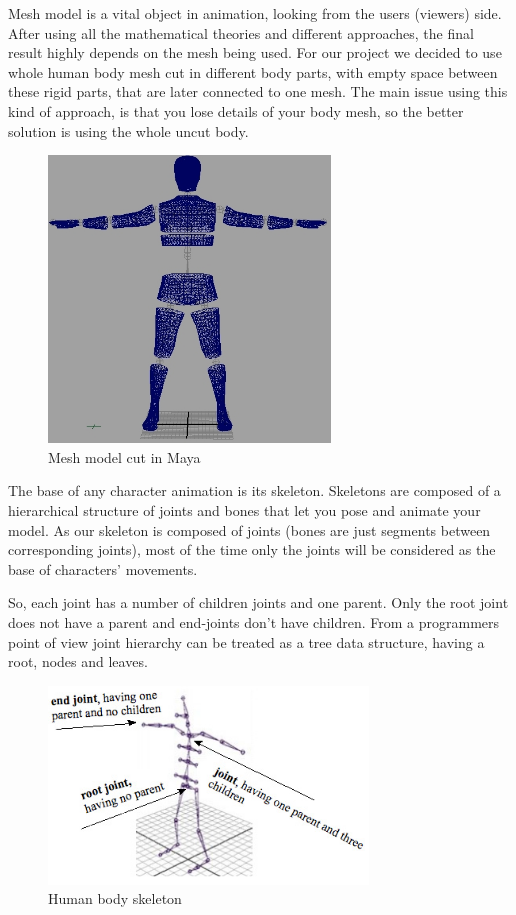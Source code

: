 \documentclass[times, 10pt,twocolumn]{article}
\begin{document}

Mesh model is a vital object in animation, looking from the users (viewers) side.
After using all the mathematical theories and different approaches, the final result
highly depends on the mesh being used.
For our project we decided to use whole human body mesh cut in different body parts,
with empty space between these rigid parts, that are later connected to one mesh.
The main issue using this kind of approach, is that you lose details of your body mesh,
so the better solution is using the whole uncut body.

\begin{figure}[H]
  \caption{Mesh model cut in Maya}
  \label{img_maya_mesh}
  \centering
  \includegraphics[width=75mm]{images/maya_cut.jpg}
\end{figure}


\label{Animating_human_body}

The base of any character animation is its skeleton. Skeletons are composed of a hierarchical structure of joints and bones that let you pose and animate your model. As our skeleton is composed of joints (bones are just  segments between corresponding joints), most of the time only the joints will be considered as the base of characters' movements.

So, each joint has a number of children joints and one parent. Only the root joint does not have a parent and end-joints don't have children. From a programmers point of view joint hierarchy can be treated as a tree data structure, having a root, nodes and leaves.

\begin{figure}[H]
  \caption{Human body skeleton}
  \centering
  \includegraphics[width=85mm]{images/bodySkeleton.jpg}
\end{figure}
\end{document}
